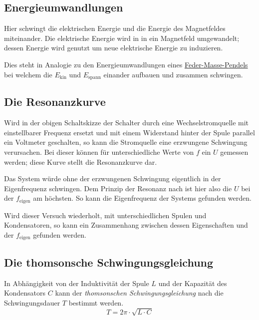 \documentclass{article}
\begin{document}
\subsection{Energieumwandlungen}
Hier schwingt die elektrischen Energie und die Energie des Magnetfeldes miteinander. Die elektrische Energie wird in in ein Magnetfeld umgewandelt; dessen Energie wird genutzt um neue elektrische Energie zu induzieren.
 
Dies steht in Analogie zu den Energieumwandlungen eines \hyperref[Das Fadenpendel]{Feder-Masse-Pendels} bei welchem die $E_\text{kin}$ und $E_\text{spann}$ einander aufbauen und zusammen schwingen.
 
\subsection{Die Resonanzkurve}
Wird in der obigen Schaltskizze der Schalter durch eine Wechselstromquelle mit einstellbarer Frequenz ersetzt und mit einem Widerstand hinter der Spule parallel ein Voltmeter geschalten, so kann die Stromquelle eine erzwungene Schwingung verursachen. Bei dieser können für unterschiedliche Werte von $f$ ein $U$ gemessen werden; diese Kurve stellt die Resonanzkurve dar.
 
Das System würde ohne der erzwungenen Schwingung eigentlich in der Eigenfrequenz schwingen. Dem Prinzip der Resonanz nach ist hier also die $U$ bei der $f_\text{eigen}$ am höchsten. So kann die Eigenfrequenz der Systems gefunden werden.
 
Wird dieser Versuch wiederholt, mit unterschiedlichen Spulen und Kondensatoren, so kann ein Zusammenhang zwischen dessen Eigenschaften und der $f_\text{eigen}$ gefunden werden.
 
\subsection{Die thomsonsche Schwingungsgleichung} 
In Abhängigkeit von der Induktivität der Spule $L$ und der Kapazität des Kondensators $C$ kann der \emph{thomsonschen Schwingungsgleichung} nach die Schwingungsdauer $T$ bestimmt werden.
\[
 T = 2\pi \cdot \sqrt{L \cdot C} 
\] 
\end{document}
